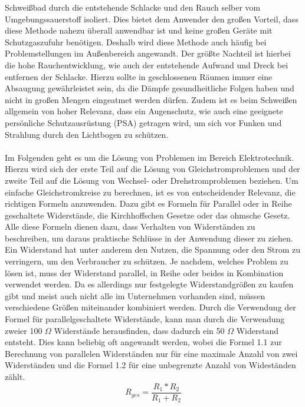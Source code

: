Schweißbad durch die entstehende Schlacke und den Rauch selber vom Umgebungssauerstoff isoliert. Dies bietet dem Anwender den großen Vorteil, dass diese 
Methode nahezu überall anwendbar ist und keine großen Geräte mit Schutzgaszufuhr benötigen. Deshalb wird diese Methode auch häufig bei Problemstellungen 
im Außenbereich angewandt. Der größte Nachteil ist hierbei die hohe Rauchentwicklung, wie auch der entstehende Aufwand und Dreck bei entfernen der Schlacke. 
Hierzu sollte in geschlossenen Räumen immer eine Absaugung gewährleistet sein, da die Dämpfe gesundheitliche Folgen haben und nicht in großen Mengen 
eingeatmet werden dürfen. Zudem ist es beim Schweißen allgemein von hoher Relevanz, dass ein Augenschutz, wie auch eine geeignete persönliche 
Schutzausrüstung (PSA) getragen wird, um sich vor Funken und Strahlung durch den Lichtbogen zu schützen. \\\\ %
Im Folgenden geht es um die Lösung von Problemen im Bereich Elektrotechnik. Hierzu wird sich der erste Teil auf die Lösung von Gleichstromproblemen und der 
zweite Teil auf die Lösung von Wechsel- oder Drehstromproblemen beziehen. Um einfache Gleichstromkreise zu berechnen, ist es von entscheidender Relevanz, 
die richtigen Formeln anzuwenden. Dazu gibt es \zB Formeln für Parallel oder in Reihe geschaltete Widerstände, die Kirchhoffschen Gesetze oder das ohmsche 
Gesetz. Alle diese Formeln dienen dazu, dass Verhalten von Widerständen zu beschreiben, um daraus praktische Schlüsse in der Anwendung dieser zu ziehen. 
Ein Widerstand hat unter anderem den Nutzen, die Spannung oder den Strom zu verringern, um den Verbraucher zu schützen. Je nachdem, welches Problem zu 
lösen ist, muss der Widerstand parallel, in Reihe oder beides in Kombination verwendet werden. Da es allerdings nur festgelegte Widerstandgrößen zu kaufen 
gibt und meist auch nicht alle im Unternehmen vorhanden sind, müssen verschiedene Größen miteinander kombiniert werden. Durch die Verwendung der Formel für 
parallelgeschaltete Widerstände, kann man \zB durch die Verwendung zweier 100 $\Omega$ Widerstände herausfinden, dass dadurch ein 50 $\Omega$ Widerstand 
entsteht. Dies kann beliebig oft angewandt werden, wobei die Formel 1.1 zur Berechnung von parallelen Widerständen nur für eine maximale Anzahl von zwei 
Widerständen und die Formel 1.2 für eine unbegrenzte Anzahl von Wideständen zählt.
\begin{equation}
R_{ges}=\frac{R_1*R_2}{R_1+R_2}
\label{eqn:Parallelschaltung von 2 Widerständen}
\end{equation}
